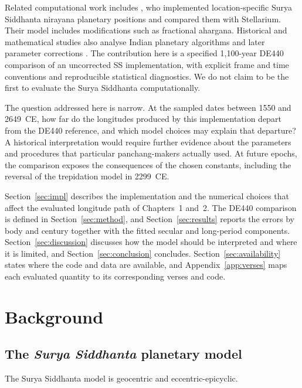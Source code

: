 \documentclass[11pt,a4paper]{article}
\begin{document}
Related computational work includes \citet{santhoju2025}, who implemented location-specific Surya Siddhanta nirayana planetary positions and compared them with Stellarium. Their model includes modifications such as fractional ahargana. Historical and mathematical studies also analyse Indian planetary algorithms and later parameter corrections \citep{pingree1978,duke2005,plofker2009}. The contribution here is a specified 1,100-year DE440 comparison of an uncorrected SS implementation, with explicit frame and time conventions and reproducible statistical diagnostics. We do not claim to be the first to evaluate the Surya Siddhanta computationally.

The question addressed here is narrow. At the sampled dates between 1550 and 2649~CE, how far do the longitudes produced by this implementation depart from the DE440 reference, and which model choices may explain that departure? A historical interpretation would require further evidence about the parameters and procedures that particular panchang-makers actually used. At future epochs, the comparison exposes the consequences of the chosen constants, including the reversal of the trepidation model in 2299~CE.

Section~\ref{sec:impl} describes the implementation and the numerical choices that affect the evaluated longitude path of Chapters~1 and~2. The DE440 comparison is defined in Section~\ref{sec:method}, and Section~\ref{sec:results} reports the errors by body and century together with the fitted secular and long-period components. Section~\ref{sec:discussion} discusses how the model should be interpreted and where it is limited, and Section~\ref{sec:conclusion} concludes. Section~\ref{sec:availability} states where the code and data are available, and Appendix~\ref{app:verses} maps each evaluated quantity to its corresponding verses and code.

\section{Background}

\subsection{The \textit{Surya Siddhanta} planetary model}

The Surya Siddhanta model is geocentric and eccentric-epicyclic.
\end{document}
